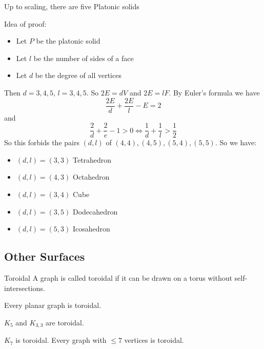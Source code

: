 \documentclass{report}
\begin{document}
\begin{theorem}{}
    Up to scaling, there are five Platonic solids
\end{theorem}
Idea of proof:
    \begin{itemize}
        \item Let $P$ be the platonic solid

        \item Let $l$ be the number of sides of a face

        \item Let $d$ be the degree of all vertices 
    \end{itemize}
Then $d = 3, 4, 5$, $l = 3, 4, 5$. So $2E = dV$ and $2E = lF$. By Euler's formula we have
    \begin{equation*}
        \dfrac{2E}{d} + \dfrac{2E}{l} - E = 2
    \end{equation*}
and
    \begin{equation*}
        \dfrac{2}{d} + \dfrac{2}{e} - 1 > 0 \iff \dfrac{ 1}{d} + \dfrac{1}{l} >\dfrac{ 1}{2}
    \end{equation*}
So this forbids the pairs $(d, l)$ of $(4, 4), (4, 5), (5, 4), (5, 5)$. So we have:
    \begin{itemize}
        \item  $(d, l) = (3, 3)$ Tetrahedron

        \item  $(d, l) = (4, 3)$ Octahedron

        \item  $(d, l) = (3, 4)$ Cube

        \item $(d, l) = (3, 5)$ Dodecahedron

        \item $(d, l) = (5, 3)$ Icosahedron 
    \end{itemize}

\begin{topic}
    \section{Other Surfaces}
\end{topic}

\begin{definition}{Toroidal}
    A graph is called toroidal if it can be drawn on a torus without self-intersections.
\end{definition}

\begin{examples}
    \begin{example}
        Every planar graph is toroidal.
    \end{example}
    \begin{example}
        $K_{5}$ and $K_{3, 3}$ are toroidal.
    \end{example}
    \begin{example}
        $K_{7}$ is toroidal. Every graph with $\leq 7$ vertices is toroidal.
    \end{example}
\end{examples}
\end{document}
